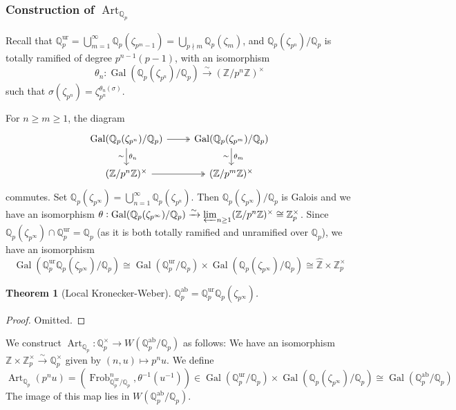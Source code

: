 \documentclass[11pt]{article}
\theoremstyle{definition}
\theoremstyle{plain}
\newtheorem{theorem}[definition]{Theorem}
\theoremstyle{remark}
\DeclareMathOperator{\Gal}{Gal}
\DeclareMathOperator{\Frob}{Frob}
\DeclareMathOperator{\Art}{Art}
\newcommand{\ZZ}{\mathbb{Z}}
\newcommand{\QQ}{\mathbb{Q}}
\newcommand{\ab}{\mathrm{ab}}
\newcommand{\ur}{\mathrm{ur}}
\begin{document}
\subsubsection*{Construction of $\Art_{\QQ_p}$}

Recall that $\QQ_p^\ur = \bigcup_{m=1}^\infty \QQ_p(\zeta_{p^m-1}) = \bigcup_{p \nmid m} \QQ_p(\zeta_m)$, and $\QQ_p(\zeta_{p^n})/\QQ_p$ is totally ramified of degree $p^{n-1}(p-1)$, with an isomorphism
\begin{equation*}
    \theta_n : \Gal(\QQ_p(\zeta_{p^n}) / \QQ_p) \xrightarrow{\sim} (\ZZ / p^n \ZZ)^\times
\end{equation*}
such that $\sigma(\zeta_{p^n}) = \zeta_{p^n}^{\theta_n(\sigma)}$.

For $n \ge m \ge 1$, the diagram
\begin{equation*}
\begin{tikzcd}
    \Gal(\QQ_p(\zeta_{p^n})/\QQ_p) \arrow[r, twoheadrightarrow] \arrow[d, "\theta_n", "\sim"'] & \Gal(\QQ_p(\zeta_{p^m})/\QQ_p) \arrow[d, "\theta_m", "\sim"']\\
    (\ZZ/p^n \ZZ)^\times \arrow[r, twoheadrightarrow] & (\ZZ/p^m \ZZ)^\times
\end{tikzcd}
\end{equation*}
commutes. Set $\QQ_p(\zeta_{p^\infty}) = \bigcup_{n=1}^\infty \QQ_p(\zeta_{p^n})$. Then $\QQ_p(\zeta_{p^\infty}) / \QQ_p$ is Galois and we have an isomorphism $\theta : \Gal(\QQ_p(\zeta_{p^\infty})/\QQ_p) \xrightarrow{\sim} \varprojlim_{n \ge 1} (\ZZ / p^n \ZZ)^\times \cong \ZZ_p^\times$. Since $\QQ_p(\zeta_{p^\infty}) \cap \QQ_p^\ur = \QQ_p$ (as it is both totally ramified and unramified over $\QQ_p$), we have an isomorphism
\begin{equation*}
    \Gal(\QQ_p^\ur \QQ_p(\zeta_{p^\infty}) / \QQ_p) \cong \Gal(\QQ_p^\ur / \QQ_p) \times \Gal(\QQ_p(\zeta_{p^\infty}) / \QQ_p) \cong \widehat{\ZZ} \times \ZZ_p^\times
\end{equation*}

\begin{theorem}[Local Kronecker-Weber]\label{thm:17_4}
    $\QQ_p^\ab = \QQ_p^\ur \QQ_p(\zeta_{p^\infty})$.
\end{theorem}
\begin{proof}
    Omitted.
\end{proof}

\noindent We construct $\Art_{\QQ_p} : \QQ_p^\times \to W(\QQ_p^\ab / \QQ_p)$ as follows: We have an isomorphism $\ZZ \times \ZZ_p^\times \xrightarrow{\sim} \QQ_p^\times$ given by $(n, u) \mapsto p^n u$. We define
\begin{equation*}
    \Art_{\QQ_p}(p^n u) = (\Frob_{\QQ_p^\ur/\QQ_p}^n, \theta^{-1}(u^{-1})) \in \Gal(\QQ_p^\ur / \QQ_p) \times \Gal(\QQ_p(\zeta_{p^\infty}) / \QQ_p) \cong \Gal(\QQ_p^\ab / \QQ_p)
\end{equation*}
The image of this map lies in $W(\QQ_p^\ab / \QQ_p)$.
\end{document}
